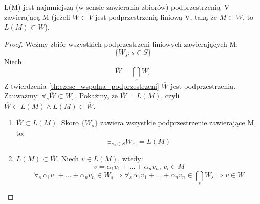 \begin{theorem}
    L(M) jest najmniejszą (w sensie zawierania zbiorów) podprzestrzenią V zawierającą M (jeżeli $W \subset V$ jest podprzestrzenią liniową V, taką że $M \subset W$, to $L(M) \subset W$).
    \begin{proof}
        Weźmy zbiór wszystkich podprzestrzeni liniowych zawierających M:
        \begin{equation*}
            \{W_s: s \in S\}
        \end{equation*}
        Niech
        \begin{equation*}
            \overline{W} = \bigcap_s W_s
        \end{equation*}
        Z twierdzenia \ref{th:czesc_wspolna_podprzestrzeni} $\overline{W}$ jest podprzestrzenią. Zauważmy: $\forall_s \overline{W} \subset W_s$. Pokażmy, że $\overline{W} = L(M)$, czyli $\overline{W} \subset L(M) \wedge L(M) \subset \overline{W}$. 
        \begin{enumerate}
            \item $\overline{W} \subset L(M)$. Skoro $\{W_s\}$ zawiera wszystkie podprzestrzenie zawierające M, to:
                \begin{equation*}
                    \exists_{s_0 \in S} W_{s_0} = L(M)
                \end{equation*}
            \item $L(M) \subset \overline{W}$. Niech $v \in L(M)$, wtedy:
                \begin{equation*}
                    v = \alpha_1 v_1 + \ldots + \alpha_n v_n, \, v_i \in M
                \end{equation*}
                \begin{equation*}
                    \forall_s \, \alpha_1 v_1 + \ldots +\alpha_n v_n \in W_s \Longrightarrow \forall_s \, \alpha_1 v_1 + \ldots +\alpha_n v_n \in \bigcap_s W_s \Longrightarrow v \in \overline{W}
                \end{equation*}
        \end{enumerate}
    \end{proof}
\end{theorem}
